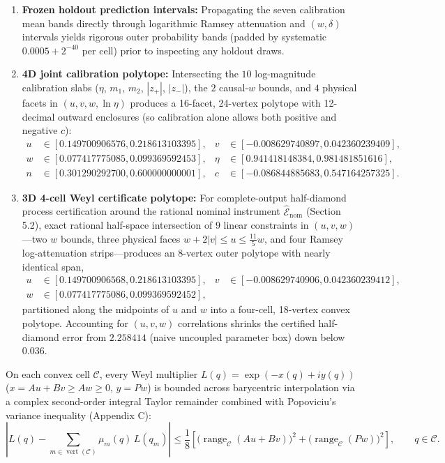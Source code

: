\documentclass[11pt,letterpaper]{article}
\theoremstyle{definition}
\providecommand{\tightlist}{\setlength{\itemsep}{2pt}\setlength{\parskip}{0pt}}
\begin{document}
\begin{enumerate}
\def\labelenumi{\arabic{enumi}.}
\tightlist
\item
  \textbf{Frozen holdout prediction intervals:} Propagating the seven
  calibration mean bands directly through logarithmic Ramsey attenuation
  and \((w, \delta)\) intervals yields rigorous outer probability bands
  (padded by systematic \(0.0005 + 2^{-40}\) per cell) prior to
  inspecting any holdout draws.
\item
  \textbf{4D joint calibration polytope:} Intersecting the \(10\)
  log-magnitude calibration slabs (\(\eta\), \(m_1\), \(m_2\),
  \(|z_+|\), \(|z_-|\)), the \(2\) causal-\(w\) bounds, and \(4\)
  physical facets in \((u, v, w, \ln\eta)\) produces a 16-facet,
  24-vertex polytope with 12-decimal outward enclosures (so calibration
  alone allows both positive and negative \(c\)): \[\begin{aligned}
  u &\in [0.149700906576, 0.218613103395], & v &\in [-0.008629740897, 0.042360239409], \\
  w &\in [0.077417775085, 0.099369592453], & \eta &\in [0.941418148384, 0.981481851616], \\
  n &\in [0.301290292700, 0.600000000001], & c &\in [-0.086844885683, 0.547164257325].
  \end{aligned}\]
\item
  \textbf{3D 4-cell Weyl certificate polytope:} For complete-output
  half-diamond process certification around the rational nominal
  instrument \(\widehat{\mathcal{E}}_{\mathrm{nom}}\) (Section 5.2),
  exact rational half-space intersection of \(9\) linear constraints in
  \((u, v, w)\)---two \(w\) bounds, three physical faces
  \(w + 2|v| \le u \le \frac{11}{5}w\), and four Ramsey log-attenuation
  strips---produces an 8-vertex outer polytope with nearly identical
  span, \[\begin{aligned}
  u &\in [0.149700906568, 0.218613103395], & v &\in [-0.008629740906, 0.042360239412], \\
  w &\in [0.077417775086, 0.099369592452], & &
  \end{aligned}\] partitioned along the midpoints of \(u\) and \(w\)
  into a four-cell, 18-vertex convex polytope. Accounting for
  \((u, v, w)\) correlations shrinks the certified half-diamond error
  from \(2.258414\) (naive uncoupled parameter box) down below
  \(0.036\).
\end{enumerate}

On each convex cell \(\mathcal{C}\), every Weyl multiplier
\(L(q) = \exp(-x(q) + iy(q))\) (\(x = Au + Bv \ge Aw \ge 0\),
\(y = Pw\)) is bounded across barycentric interpolation via a complex
second-order integral Taylor remainder combined with Popoviciu's
variance inequality (Appendix C):
\[\left|L(q) - \sum_{m \in \operatorname{vert}(\mathcal{C})} \mu_m(q)\,L(q_m)\right| \le \frac{1}{8}\left[\Big(\operatorname{range}_{\mathcal{C}}(Au + Bv)\Big)^2 + \Big(\operatorname{range}_{\mathcal{C}}(Pw)\Big)^2\right], \qquad q \in \mathcal{C}.
\tag{22}\]
\end{document}
